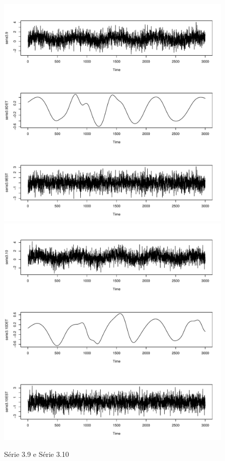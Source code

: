 \graphicspath{{imagens/}}
\begin{figure}[H]
\begin{center}
  \includegraphics[scale=0.43]{serie3_9.pdf} \quad
  \includegraphics[scale=0.43]{serie3_10.pdf}
  \caption{Série 3.9 e Série 3.10}

\end{center}
\end{figure}

